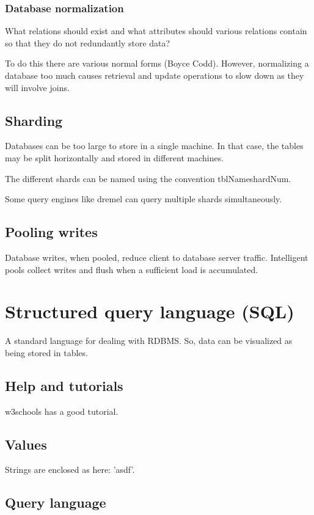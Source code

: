 \documentclass[oneside, article]{memoir}
\begin{document}
\subsection{Database normalization}
What relations should exist and what attributes should various relations contain so that they do not redundantly store data?

To do this there are various normal forms (Boyce Codd). However, normalizing a database too much causes retrieval and update operations to slow down as they will involve joins.

\section{Sharding}
Databases can be too large to store in a single machine. In that case, the tables may be split horizontally and stored in different machines.

The different shards can be named using the convention tblName\@ shardNum.

Some query engines like dremel can query multiple shards simultaneously.

\section{Pooling writes}
Database writes, when pooled, reduce client to database server traffic. Intelligent pools collect writes and flush when a sufficient load is accumulated.

\chapter{Structured query language (SQL)}
A standard language for dealing with RDBMS. So, data can be visualized as being stored in tables.

\section{Help and tutorials}
w3schools has a good tutorial.

\section{Values}
Strings are enclosed as here: 'asdf'.

\section{Query language}
\end{document}
